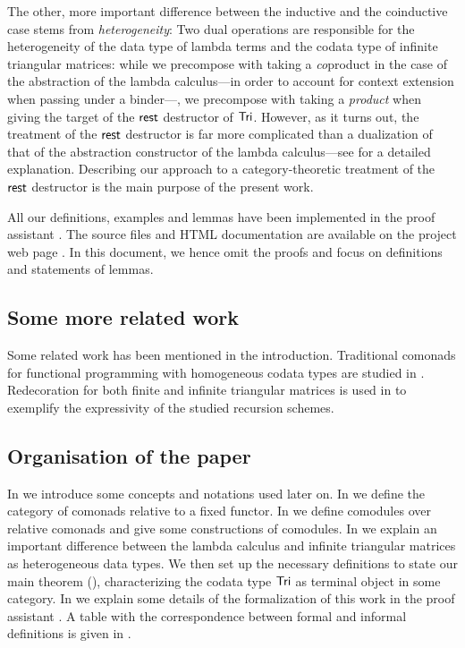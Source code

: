 \documentclass{amsart}
\begin{document}
 The other, more important difference between the inductive and the coinductive case stems from \emph{heterogeneity}:
 Two dual operations are responsible for the heterogeneity of the data type of lambda terms and the codata type of infinite triangular
 matrices: while we precompose with taking a \emph{co}product in the case of the abstraction of the lambda calculus---in order to account
 for context extension when passing under a binder---,
 we precompose with taking a \emph{product} when giving the target of the $\mathsf{rest}$ destructor of $\mathsf{Tri}$.
 However, as it turns out, the treatment of the $\mathsf{rest}$ destructor is far more complicated than a dualization of that of the abstraction 
 constructor of the lambda calculus---see  for a detailed explanation. 
 Describing our approach to a category-theoretic treatment of the $\mathsf{rest}$ destructor is the main purpose of the present work.
 
 All our definitions, examples and lemmas have been implemented in the proof assistant \coq \parencite{coq84pl3}.
 The \coq source files and HTML documentation are available on the project web page \parencite{trimat_coq}.
 In this document, we hence omit the proofs and focus on definitions and statements of lemmas.
 
 
 \subsection*{Some more related work}
 Some related work has been mentioned in the introduction.
 Traditional comonads for functional programming with homogeneous codata types are studied in \parencite{DBLP:conf/sfp/UustaluV01}.
 Redecoration for both finite and infinite triangular matrices is used in \parencite{DBLP:journals/tcs/AbelMU05} to exemplify 
 the expressivity of the studied recursion schemes.
 
 
 
\subsection*{Organisation of the paper}
  In  we introduce some concepts and notations used later on.
  In  we define the category of comonads relative to a fixed functor.
  In  we define comodules over relative comonads and give some constructions of comodules.
  In  we explain an important difference between the lambda calculus and infinite triangular matrices
    as heterogeneous data types. We then set up the necessary definitions to state our main theorem (), 
    characterizing the codata type $\mathsf{Tri}$ as terminal object in some category.
  In  we explain some details of the formalization of this work in the proof assistant \coq.
  A table with the correspondence between formal and informal definitions is given in .
\end{document}

